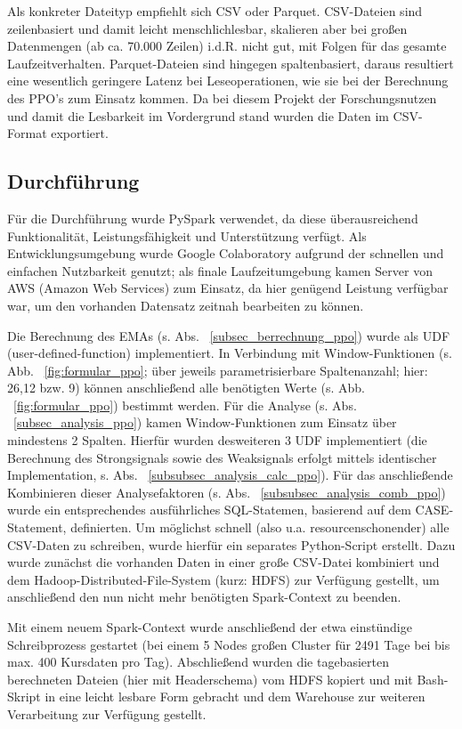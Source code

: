 Als konkreter Dateityp empfiehlt sich CSV oder Parquet. CSV-Dateien sind zeilenbasiert und damit leicht menschlichlesbar, skalieren aber bei großen Datenmengen (ab ca. 70.000 Zeilen) i.d.R. nicht gut, mit Folgen für das gesamte Laufzeitverhalten. Parquet-Dateien sind hingegen spaltenbasiert, daraus resultiert eine wesentlich geringere Latenz bei Leseoperationen, wie sie bei der Berechnung des PPO's zum Einsatz kommen. Da bei diesem Projekt der Forschungsnutzen und damit die Lesbarkeit im Vordergrund stand wurden die Daten im CSV-Format exportiert. \cite{medCsvParq,dzCsvParq,wikiCsv,wikiParq}

\subsection{Durchführung}
Für die Durchführung wurde PySpark verwendet, da diese überausreichend Funktionalität, Leistungsfähigkeit und Unterstützung verfügt. Als Entwicklungsumgebung wurde Google Colaboratory aufgrund der schnellen und einfachen Nutzbarkeit genutzt; als finale Laufzeitumgebung kamen Server von AWS (Amazon Web Services) zum Einsatz, da hier genügend Leistung verfügbar war, um den vorhanden Datensatz zeitnah bearbeiten zu können.

Die Berechnung des EMAs (s. Abs. ~\ref{subsec_berrechnung_ppo}) wurde als UDF (user-defined-function) implementiert. In Verbindung mit Window-Funk\-tionen (s. Abb. ~\ref{fig:formular_ppo}; über jeweils parametrisierbare Spaltenanzahl; hier: 26,12 bzw. 9) können anschließend alle benötigten Werte (s. Abb. ~\ref{fig:formular_ppo}) bestimmt werden.
Für die Analyse (s. Abs. ~\ref{subsec_analysis_ppo}) kamen Window-Funktionen zum Einsatz über mindestens 2 Spalten. Hierfür wurden desweiteren 3 UDF implementiert (die Berechnung des Strongsignals sowie des Weaksignals erfolgt mittels identischer Implementation, s. Abs. ~\ref{subsubsec_analysis_calc_ppo}). Für das anschließende Kombinieren dieser Analysefaktoren (s. Abs. ~\ref{subsubsec_analysis_comb_ppo}) wurde ein entsprechendes ausführliches SQL-Statemen, basierend auf dem CASE-Statement, definierten.
Um möglichst schnell (also u.a. resourcenschonender) alle CSV-Daten zu schreiben, wurde hierfür ein separates Python-Script erstellt. Dazu wurde zunächst die vorhanden Daten in einer große CSV-Datei kombiniert und dem Hadoop-Distributed-File-System (kurz: HDFS) zur Verfügung gestellt, um anschließend den nun nicht mehr benötigten Spark-Context zu beenden. 

Mit einem neuem Spark-Context wurde anschließend der etwa einstündige Schreibprozess gestartet (bei einem 5 Nodes großen Cluster für 2491 Tage bei bis max. 400 Kursdaten pro Tag). Abschließend wurden die tagebasierten berechneten Dateien (hier mit Headerschema) vom HDFS kopiert und mit Bash-Skript in eine leicht lesbare Form gebracht und dem Warehouse zur weiteren Verarbeitung zur Verfügung gestellt. 


